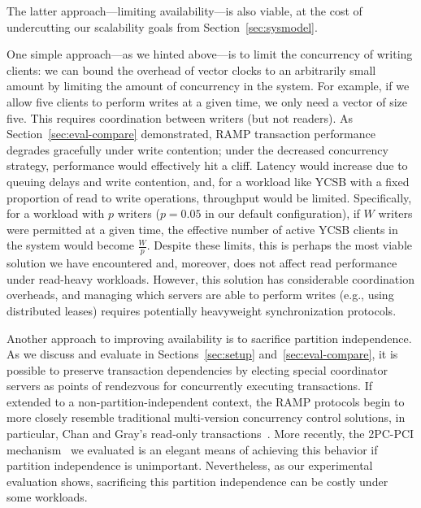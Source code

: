 The latter approach---limiting availability---is also viable, at the cost of undercutting our scalability goals from Section~\ref{sec:sysmodel}.

 One simple approach---as we hinted above---is to limit the concurrency of writing clients: we can bound the overhead of vector clocks to an arbitrarily small amount by limiting the amount of concurrency in the system. For example, if we allow five clients to perform writes at a given time, we only need a vector of size five. This requires coordination between writers (but not readers). As Section~\ref{sec:eval-compare} demonstrated, RAMP transaction performance degrades gracefully under write contention; under the decreased concurrency strategy, performance would effectively hit a cliff. Latency would increase due to queuing delays and write contention, and, for a workload like YCSB with a fixed proportion of read to write operations, throughput would be limited. Specifically, for a workload with $p$ writers ($p=0.05$ in our default configuration), if $W$ writers were permitted at a given time, the effective number of active YCSB clients in the system would become $\frac{W}{p}$. Despite these limits, this is perhaps the most viable solution we have encountered and, moreover, does not affect read performance under read-heavy workloads. However, this solution has considerable coordination overheads, and managing which servers are able to perform writes (e.g., using distributed leases) requires potentially heavyweight synchronization protocols.

 Another approach to improving availability is to sacrifice partition independence. As we discuss and evaluate in Sections~\ref{sec:setup} and~\ref{sec:eval-compare}, it is possible to preserve transaction dependencies by electing special coordinator servers as points of rendezvous for concurrently executing transactions. If extended to a non-partition-independent context, the RAMP protocols begin to more closely resemble traditional multi-version concurrency control solutions, in particular, Chan and Gray's read-only transactions~\cite{readonly}. More recently, the 2PC-PCI mechanism~\cite{eiger} we evaluated is an elegant means of achieving this behavior if partition independence is unimportant. Nevertheless, as our experimental evaluation shows, sacrificing this partition independence can be costly under some workloads.

